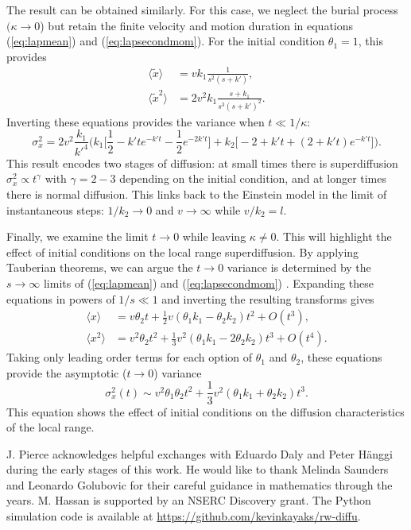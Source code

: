 \documentclass[]{agujournal2018}
\newcommand\be{\begin{equation}}
\newcommand\ee{\end{equation}}
\newcommand\bra{\langle}
\newcommand\ket{\rangle}
\begin{document}
The \citet{Lisle1998} result can be obtained similarly. For this case, we neglect the burial process $(\kappa \rightarrow 0$) but retain the finite velocity and motion duration in equations (\ref{eq:lapmean}) and (\ref{eq:lapsecondmom}).
For the initial condition $\theta_1=1$, this provides 
\begin{align}
\bra \tilde{x} \ket &= vk_1 \frac{1 }{s^2(s+k')}, \label{eq:li1}\\
\bra \tilde{x}^2 \ket &= 2v^2k_1 \frac{s+k_1}{s^3(s+k')^2}. \label{eq:li2}
\end{align}
Inverting these equations provides the variance when $t\ll 1/\kappa$:
\be \sigma_x^2 = 2v^2\frac{k_1}{k'^4}\Big(k_1\big[\frac{1}{2} - k'te^{-k't} - \frac{1}{2} e^{-2k't}\big] + k_2\big[-2+k't + (2+k't)e^{-k't}\big]\Big).\ee
This result encodes two stages of diffusion: at small times there is superdiffusion $\sigma_x^2 \propto t^\gamma$ with $\gamma = 2-3$ depending on the initial condition, and at longer times there is normal diffusion. This links back to the Einstein model in the limit of instantaneous steps: $1/k_2 \rightarrow 0$ and $v\rightarrow \infty$ while $v/k_2 = l$.

Finally, we examine the limit $t\rightarrow 0 $ while leaving $\kappa \neq 0$. This will highlight the effect of initial conditions on the local range superdiffusion.
By applying Tauberian theorems, we can argue the $ t \rightarrow 0$ variance is determined by the $s\rightarrow \infty$ limits of (\ref{eq:lapmean}) and (\ref{eq:lapsecondmom}) \citep[e.g.][]{Weiss1994, Weeks1998}.  Expanding these equations in powers of $1/s \ll 1$ and inverting the resulting transforms gives
\begin{align} \bra x \ket &= v \theta_2 t + \frac{1}{2}v(\theta_1k_1-\theta_2k_2)t^2 + O(t^3),\\
\bra x^2 \ket &= v^2\theta_2 t^2 + \frac{1}{3}v^2(\theta_1k_1-2\theta_2k_2)t^3+ O(t^4).
\end{align}
Taking only leading order terms for each option of $\theta_1$ and $\theta_2$, these equations provide the asymptotic ($t\rightarrow 0$) variance 
\be \sigma_x^2(t) \sim v^2\theta_1\theta_2t^2 + \frac{1}{3}v^2(\theta_1k_1+\theta_2k_2)t^3.\ee
This equation shows the effect of initial conditions on the diffusion characteristics of the local range.

\acknowledgments
J. Pierce acknowledges helpful exchanges with Eduardo Daly and Peter H{\"a}nggi during the early stages of this work. He would like to thank Melinda Saunders and Leonardo Golubovic for their careful guidance in mathematics through the years. M. Hassan is supported by an NSERC Discovery grant. The Python simulation code is available at \sloppy
\url{https://github.com/kevinkayaks/rw-diffu}.


\end{document}

